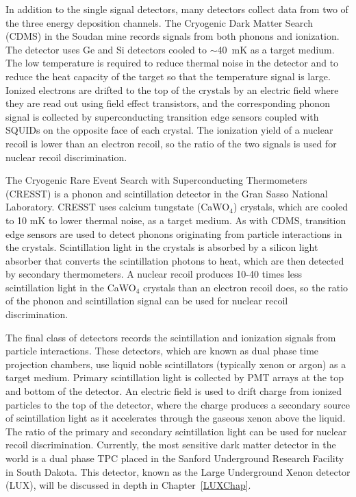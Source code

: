 In addition to the single signal detectors, many detectors collect data from two of the three energy deposition channels.  The Cryogenic Dark Matter Search (CDMS)  in the Soudan mine records signals from both phonons and ionization.  The detector uses Ge and Si detectors cooled to $\sim$40~mK as a target medium.  The low temperature is required to reduce thermal noise in the detector and to reduce the heat capacity of the target so that the temperature signal is large.  Ionized electrons are drifted to the top of the crystals by an electric field where they are read out using field effect transistors, and the corresponding phonon signal is collected by superconducting transition edge sensors coupled with SQUIDs on the opposite face of each crystal.  The ionization yield of a nuclear recoil is lower than an electron recoil, so the ratio of the two signals is used for nuclear recoil discrimination.

The Cryogenic Rare Event Search with Superconducting Thermometers (CRESST) is a phonon and scintillation detector in the Gran Sasso National Laboratory.  CRESST uses calcium tungstate (CaWO$_4$) crystals, which are cooled to 10 mK to lower thermal noise, as a target medium. As with CDMS, transition edge sensors are used to detect phonons originating from particle interactions in the crystals.  Scintillation light in the crystals is  absorbed by a silicon light absorber that converts the scintillation photons to heat, which are then detected by secondary thermometers.  A nuclear recoil produces 10-40 times less scintillation light in the CaWO$_4$ crystals than an electron recoil does, so the ratio of the phonon and scintillation signal can be used for nuclear recoil discrimination.

The final class of detectors records the scintillation and ionization signals from particle interactions.  These detectors, which are known as dual phase time projection chambers, use liquid noble scintillators (typically xenon or argon) as a target medium. Primary scintillation light is collected by PMT arrays at the top and bottom of the detector. An electric field is used to drift charge from ionized particles to the top of the detector, where the charge produces a secondary source of scintillation light as it accelerates through the gaseous xenon above the liquid.  The ratio of the primary and secondary scintillation light can be used for nuclear recoil discrimination.  Currently, the most sensitive dark matter detector in the world is a dual phase TPC placed in the Sanford Underground Research Facility in South Dakota.  This detector, known as the Large Underground Xenon detector (LUX), will be discussed in depth in Chapter~\ref{LUXChap}.
